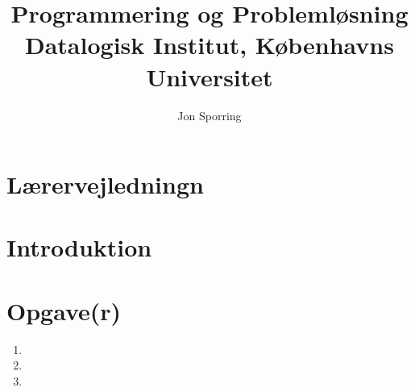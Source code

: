 \documentclass[a4paper,12pt]{article}
\title{Programmering og Problemløsning\\Datalogisk Institut,
  Københavns Universitet}
\author{Jon Sporring}
\begin{document}
\maketitle

\section{Lærervejledningn}

\section{Introduktion}

\section{Opgave(r)}
\begin{enumerate}
\item 
\item 
\item 
\end{enumerate}
\end{document}
